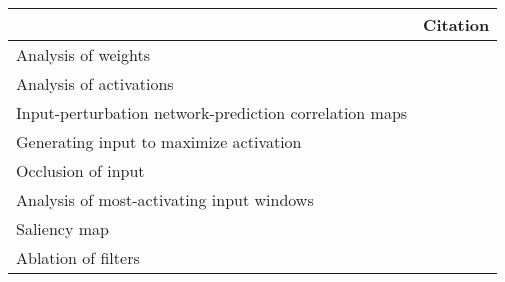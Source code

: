 \begin{tabular}{ll}
\toprule
{} &                                                                                                                                                                                          Citation \\
\midrule
Analysis of weights                                    &  \cite{Perez-Benitez2018, Yoon2018, Langkvist2018, Deiss2018, Lawhern2018, Xu2016, Tsinalis2016a, Nurse2016, Tabar2016a, Zheng2015, Stober2015, Manor2015, Yang2015a, Langkvist2012, Cecotti2011} \\
Analysis of activations                                &                                                                                           \cite{Yuan2018a, Waytowich2018, Lawhern2018, kwak2017, Yin2017a, Supratak2017, Shamwell2016, Manor2015} \\
Input-perturbation network-prediction correlation maps &                                                                                                              \cite{Schirrmeister2017a, Volker2018, Hartmann2018b, Behncke2017, Schirrmeister2017} \\
Generating input to maximize activation                &                                                                                                                                      \cite{VanPutten2018b, Ruffini2018a, Sors2018, Bashivan2016a} \\
Occlusion of input                                     &                                                                                                                                                        \cite{Lee2018, Chambon2018, Thodoroff2016} \\
Analysis of most-activating input windows              &                                                                                                                                                                              \cite{Hartmann2018b} \\
Saliency map                                           &                                                                                                                                                                               \cite{Vilamala2017} \\
Ablation of filters                                    &                                                                                                                                                                                \cite{Lawhern2018} \\

\end{tabular}
